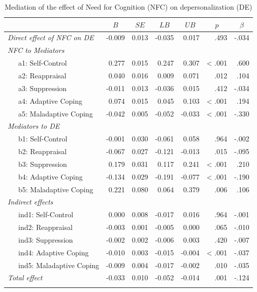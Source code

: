 \documentclass[
  man]{apa6}
\begin{document}
\begin{table}[tbp]

\begin{center}
\begin{threeparttable}

\caption{\label{tab:RQ6}Mediation of the effect of Need for Cognition (NFC) on depersonalization (DE)}

\footnotesize{

\begin{tabular}{lrrrrrr}
\toprule
 & \multicolumn{1}{c}{$B$} & \multicolumn{1}{c}{$SE$} & \multicolumn{1}{c}{$LB$} & \multicolumn{1}{c}{$UB$} & \multicolumn{1}{c}{$p$} & \multicolumn{1}{c}{$\beta$}\\
\midrule
\textit{Direct effect of NFC on DE} & -0.009 & 0.013 & -0.035 & 0.017 & .493 & -.034\\ \midrule
\textit{NFC to Mediators} &  &  &  &  &  & \\
\ \ \ a1: Self-Control & 0.277 & 0.015 & 0.247 & 0.307 & < .001 & .600\\
\ \ \ a2: Reappraisal & 0.040 & 0.016 & 0.009 & 0.071 & .012 & .104\\
\ \ \ a3: Suppression & -0.011 & 0.013 & -0.036 & 0.015 & .412 & -.034\\
\ \ \ a4: Adaptive Coping & 0.074 & 0.015 & 0.045 & 0.103 & < .001 & .194\\
\ \ \ a5: Maladaptive Coping & -0.042 & 0.005 & -0.052 & -0.033 & < .001 & -.330\\ \midrule
\textit{Mediators to DE} &  &  &  &  &  & \\
\ \ \ b1: Self-Control & -0.001 & 0.030 & -0.061 & 0.058 & .964 & -.002\\
\ \ \ b2: Reappraisal & -0.067 & 0.027 & -0.121 & -0.013 & .015 & -.095\\
\ \ \ b3: Suppression & 0.179 & 0.031 & 0.117 & 0.241 & < .001 & .210\\
\ \ \ b4: Adaptive Coping & -0.134 & 0.029 & -0.191 & -0.077 & < .001 & -.190\\
\ \ \ b5: Maladaptive Coping & 0.221 & 0.080 & 0.064 & 0.379 & .006 & .106\\ \midrule
\textit{Indirect effects} &  &  &  &  &  & \\
\ \ \ ind1: Self-Control & 0.000 & 0.008 & -0.017 & 0.016 & .964 & -.001\\
\ \ \ ind2: Reappraisal & -0.003 & 0.001 & -0.005 & 0.000 & .065 & -.010\\
\ \ \ ind3: Suppression & -0.002 & 0.002 & -0.006 & 0.003 & .420 & -.007\\
\ \ \ ind4: Adaptive Coping & -0.010 & 0.003 & -0.015 & -0.004 & < .001 & -.037\\
\ \ \ ind5: Maladaptive Coping & -0.009 & 0.004 & -0.017 & -0.002 & .010 & -.035\\ \midrule
\textit{Total effect} & -0.033 & 0.010 & -0.052 & -0.014 & .001 & -.124\\
\bottomrule
\addlinespace
\end{tabular}

}
\end{threeparttable}
\end{center}
\end{table}
\end{document}
